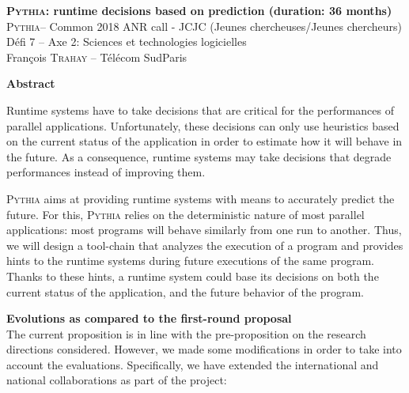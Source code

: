 \documentclass[a4paper,11pt,defblank]{article}
\newcommand{\pname}{\textsc{Pythia}\xspace}
\begin{document}
\setcounter{secnumdepth}{0}

\begin{center}

  {\Large\sc\bf\color{Brown}
    \pname: runtime decisions based on prediction (duration: 36 months)
  }\\


  {
    \footnotesize
    \pname -- Common 2018 ANR call - JCJC (Jeunes chercheuses/Jeunes chercheurs)\\
    Défi 7 -- Axe 2: Sciences et technologies logicielles\\
  }
  François \textsc{Trahay} -- Télécom SudParis
\end{center}

\setcounter{tocdepth}{3}
\tableofcontents

\textbf{Abstract}

Runtime systems have to take decisions that are critical for the
performances of parallel applications. Unfortunately, these decisions
can only use heuristics based on the current status of the application
in order to estimate how it will behave in the future.
%
As a consequence, runtime systems may take decisions that degrade
performances instead of improving them.

\pname aims at providing runtime systems with means to accurately
predict the future. For this, \pname relies on the deterministic
nature of most parallel applications: most programs will behave
similarly from one run to another. Thus, we will design a tool-chain
that analyzes the execution of a program and provides hints to the
runtime systems during future executions of the same program. Thanks
to these hints, a runtime system could base its decisions on both the
current status of the application, and the future behavior of the
program.


\textbf{Evolutions as compared to the first-round proposal}\\

The current proposition is in line with the pre-proposition on the
research directions considered. However, we made some modifications in
order to take into account the evaluations. Specifically, we have
extended the international and national collaborations as part of the
project:
\end{document}
